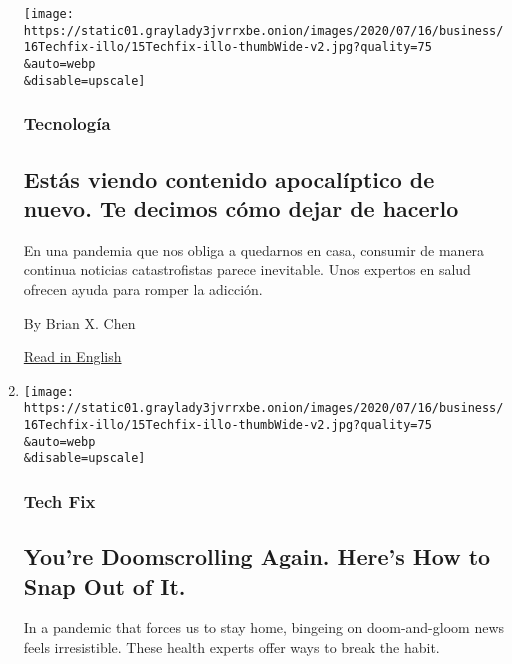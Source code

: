 \begin{enumerate}
  \texttt{[image: https://static01.graylady3jvrrxbe.onion/images/2020/07/16/business/16Techfix-illo/15Techfix-illo-thumbWide-v2.jpg?quality=75\\\&auto=webp\\\&disable=upscale]}

  \hypertarget{tecnologuxeda}{%
  \subsubsection{Tecnología}\label{tecnologuxeda}}

  \hypertarget{estuxe1s-viendo-contenido-apocaluxedptico-de-nuevo-te-decimos-cuxf3mo-dejar-de-hacerlo}{%
  \subsection{Estás viendo contenido apocalíptico de nuevo. Te decimos
  cómo dejar de
  hacerlo}\label{estuxe1s-viendo-contenido-apocaluxedptico-de-nuevo-te-decimos-cuxf3mo-dejar-de-hacerlo}}

  En una pandemia que nos obliga a quedarnos en casa, consumir de manera
  continua noticias catastrofistas parece inevitable. Unos expertos en
  salud ofrecen ayuda para romper la adicción.

  By Brian X. Chen

  \href{https://www.nytimes3xbfgragh.onion/2020/07/15/technology/personaltech/youre-doomscrolling-again-heres-how-to-snap-out-of-it.html}{Read
  in English}
\item
  \href{/2020/07/15/technology/personaltech/youre-doomscrolling-again-heres-how-to-snap-out-of-it.html}{}

  \texttt{[image: https://static01.graylady3jvrrxbe.onion/images/2020/07/16/business/16Techfix-illo/15Techfix-illo-thumbWide-v2.jpg?quality=75\\\&auto=webp\\\&disable=upscale]}

  \hypertarget{tech-fix-2}{%
  \subsubsection{Tech Fix}\label{tech-fix-2}}

  \hypertarget{youre-doomscrolling-again-heres-how-to-snap-out-of-it}{%
  \subsection{You're Doomscrolling Again. Here's How to Snap Out of
  It.}\label{youre-doomscrolling-again-heres-how-to-snap-out-of-it}}

  In a pandemic that forces us to stay home, bingeing on doom-and-gloom
  news feels irresistible. These health experts offer ways to break the
  habit.


\end{enumerate}
